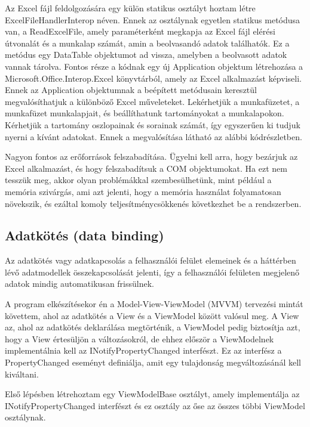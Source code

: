 \documentclass[
]{thesis-ekf}
\theoremstyle{definition}
\theoremstyle{remark}
\begin{document}
Az Excel fájl feldolgozására egy külön statikus osztályt hoztam létre ExcelFileHandlerInterop néven. Ennek az osztálynak egyetlen statikus metódusa van, a ReadExcelFile, amely paraméterként megkapja az Excel fájl elérési útvonalát és a munkalap számát, amin a beolvasandó adatok találhatók. Ez a metódus egy DataTable objektumot ad vissza, amelyben a beolvasott adatok vannak tárolva. Fontos része a kódnak egy új Application objektum létrehozása a Microsoft.Office.Interop.Excel könyvtárból, amely az Excel alkalmazást képviseli. Ennek az Application objektumnak a beépített metódusain keresztül megvalósíthatjuk a különböző Excel műveleteket. Lekérhetjük a munkafüzetet, a munkafüzet munkalapjait, és beállíthatunk tartományokat a munkalapokon. Kérhetjük a tartomány oszlopainak és sorainak számát, így egyszerűen ki tudjuk nyerni a kívánt adatokat. Ennek a megvalósítása látható az alábbi kódrészletben.



Nagyon fontos az erőforrások felszabadítása. Ügyelni kell arra, hogy bezárjuk az Excel alkalmazást, és hogy felszabadítsuk a COM objektumokat. Ha ezt nem tesszük meg, akkor olyan problémákkal szembesülhetünk, mint például a memória szivárgás, ami azt jelenti, hogy a memória használat folyamatosan növekszik, és ezáltal komoly teljesítménycsökkenés következhet be a rendszerben.
\subsection{Adatkötés (data binding) \cite{Binding} \cite{WPF}}
Az adatkötés vagy adatkapcsolás a felhasználói felület elemeinek és a háttérben lévő adatmodellek összekapcsolását jelenti, így a felhasználói felületen megjelenő adatok mindig automatikusan frissülnek.

A program elkészítésekor én a Model-View-ViewModel (MVVM) tervezési mintát követtem, ahol az adatkötés a View és a ViewModel között valósul meg. A View az, ahol az adatkötés deklarálása megtörténik, a ViewModel pedig biztosítja azt, hogy a View értesüljön a változásokról, de ehhez először a ViewModelnek implementálnia kell az INotifyPropertyChanged interfészt. Ez az interfész a PropertyChanged eseményt definiálja, amit egy tulajdonság megváltozásánál kell kiváltani.

Első lépésben létrehoztam egy ViewModelBase osztályt, amely implementálja az INotifyPropertyChanged interfészt és ez osztály az őse az összes többi ViewModel osztálynak.
\end{document}
